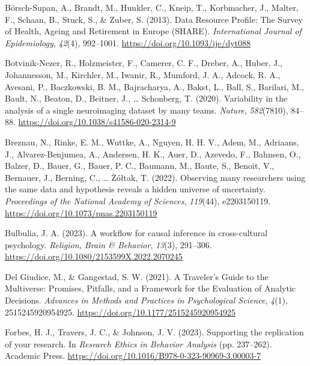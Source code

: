 \documentclass[
  man,
  floatsintext,
  longtable,
  nolmodern,
  notxfonts,
  notimes,
  colorlinks=true,linkcolor=blue,citecolor=blue,urlcolor=blue]{apa7}
\newlength{\cslhangindent}
\newenvironment{CSLReferences}[2] %
 {\begin{list}{}{%
  \setlength{\itemindent}{0pt}
  \setlength{\leftmargin}{0pt}
  \setlength{\parsep}{0pt}
  \ifodd #1
   \setlength{\leftmargin}{\cslhangindent}
   \setlength{\itemindent}{-1\cslhangindent}
  \fi
  \setlength{\itemsep}{#2\baselineskip}}}
 {\end{list}}
\begin{document}
\begin{CSLReferences}{1}{0}
Börsch-Supan, A., Brandt, M., Hunkler, C., Kneip, T., Korbmacher, J.,
Malter, F., Schaan, B., Stuck, S., \& Zuber, S. (2013). Data {Resource}
{Profile}: {The} {Survey} of {Health}, {Ageing} and {Retirement} in
{Europe} ({SHARE}). \emph{International Journal of Epidemiology},
\emph{42}(4), 992--1001. \url{https://doi.org/10.1093/ije/dyt088}

Botvinik-Nezer, R., Holzmeister, F., Camerer, C. F., Dreber, A., Huber,
J., Johannesson, M., Kirchler, M., Iwanir, R., Mumford, J. A., Adcock,
R. A., Avesani, P., Baczkowski, B. M., Bajracharya, A., Bakst, L., Ball,
S., Barilari, M., Bault, N., Beaton, D., Beitner, J., \ldots{}
Schonberg, T. (2020). Variability in the analysis of a single
neuroimaging dataset by many teams. \emph{Nature}, \emph{582}(7810),
84--88. \url{https://doi.org/10.1038/s41586-020-2314-9}

Breznau, N., Rinke, E. M., Wuttke, A., Nguyen, H. H. V., Adem, M.,
Adriaans, J., Alvarez-Benjumea, A., Andersen, H. K., Auer, D., Azevedo,
F., Bahnsen, O., Balzer, D., Bauer, G., Bauer, P. C., Baumann, M.,
Baute, S., Benoit, V., Bernauer, J., Berning, C., \ldots{} Żółtak, T.
(2022). Observing many researchers using the same data and hypothesis
reveals a hidden universe of uncertainty. \emph{Proceedings of the
National Academy of Sciences}, \emph{119}(44), e2203150119.
\url{https://doi.org/10.1073/pnas.2203150119}

Bulbulia, J. A. (2023). A workflow for causal inference in
cross-cultural psychology. \emph{Religion, Brain \& Behavior},
\emph{13}(3), 291--306.
\url{https://doi.org/10.1080/2153599X.2022.2070245}

Del Giudice, M., \& Gangestad, S. W. (2021). A {Traveler}'s {Guide} to
the {Multiverse}: {Promises}, {Pitfalls}, and a {Framework} for the
{Evaluation} of {Analytic} {Decisions}. \emph{Advances in Methods and
Practices in Psychological Science}, \emph{4}(1), 2515245920954925.
\url{https://doi.org/10.1177/2515245920954925}

Forbes, H. J., Travers, J. C., \& Johnson, J. V. (2023). Supporting the
replication of your research. In \emph{Research {Ethics} in {Behavior}
{Analysis}} (pp. 237--262). Academic Press.
\url{https://doi.org/10.1016/B978-0-323-90969-3.00003-7}


\end{CSLReferences}
\end{document}
